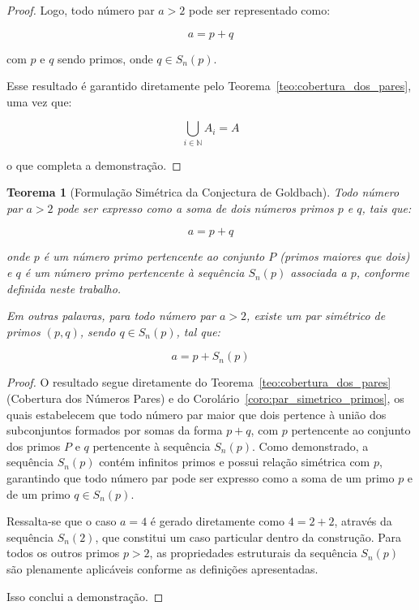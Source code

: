\documentclass[a4paper,11pt]{article}
\newtheorem{theorem}{Teorema}[section]
\theoremstyle{definition}
\theoremstyle{remark}
\begin{document}
\begin{otherlanguage}{brazil}
\begin{proof}
		Logo, todo número par \(a > 2\) pode ser representado como:
		
		\[
		a = p + q
		\]
		
		com \(p\) e \(q\) sendo primos, onde \(q \in S_n(p)\).
		
		Esse resultado é garantido diretamente pelo Teorema~\ref{teo:cobertura_dos_pares}, uma vez que:
		
		\[
		\bigcup_{i \in \mathbb{N}} A_i = A
		\]
		
		o que completa a demonstração. 
	\end{proof}
	
	
	\begin{theorem}[Formulação Simétrica da Conjectura de Goldbach]\label{teo:goldbach_por_simetria_de_primos}
		Todo número par \(a > 2\) pode ser expresso como a soma de dois números primos \(p\) e \(q\), tais que:
		
		\[
		a = p + q
		\]
		
		onde \(p\) é um número primo pertencente ao conjunto \(P\) (primos maiores que dois) e \(q\) é um número primo pertencente à sequência \(S_n(p)\) associada a \(p\), conforme definida neste trabalho.
		
		Em outras palavras, para todo número par \(a > 2\), existe um par simétrico de primos \((p, q)\), sendo \(q \in S_n(p)\), tal que:
		
		\[
		a = p + S_n(p)
		\]
	\end{theorem}
	\begin{proof}
	O resultado segue diretamente do Teorema~\ref{teo:cobertura_dos_pares} (Cobertura dos Números Pares) e do Corolário~\ref{coro:par_simetrico_primos}, os quais estabelecem que todo número par maior que dois pertence à união dos subconjuntos formados por somas da forma \(p + q\), com \(p\) pertencente ao conjunto dos primos \(P\) e \(q\) pertencente à sequência \(S_n(p)\). Como demonstrado, a sequência \(S_n(p)\) contém infinitos primos e possui relação simétrica com \(p\), garantindo que todo número par pode ser expresso como a soma de um primo \(p\) e de um primo \(q \in S_n(p)\).
	
	Ressalta-se que o caso \(a = 4\) é gerado diretamente como \(4 = 2 + 2\), através da sequência \(S_n(2)\), que constitui um caso particular dentro da construção. Para todos os outros primos \(p > 2\), as propriedades estruturais da sequência \(S_n(p)\) são plenamente aplicáveis conforme as definições apresentadas.
	
	Isso conclui a demonstração.
	\end{proof}
	

\end{otherlanguage}
\end{document}
